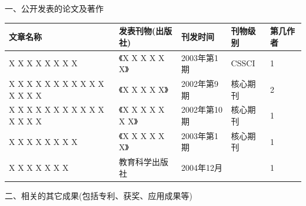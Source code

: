 \achievements

\noindent
一、公开发表的论文及著作
\begin{table}[hbp]
    \linespread{1.1}\selectfont
    \renewcommand\arraystretch{1.2}
    \setlength\tabcolsep{6pt}
    \begin{tabular}{|C{.35\textwidth}|C{.2\textwidth}|C{.14\textwidth}|C{.09\textwidth}|C{.0715\textwidth}|}
        \hline
        \textbf{文章名称} & \textbf{发表刊物(出版社)} & \textbf{刊发时间} & \textbf{刊物级别} & \textbf{第几作者} \\ \hline
        X X X X X X X X & 《X X X X X X》 & 2003年第1期 & CSSCI & 1 \\ \hline
        X X X X X X X X X X X X X X X & 《X X X X X》 & 2002年第9期 & 核心期刊 & 2 \\ \hline
        X X X X X X X X X X X X X X X & 《X X X X X X X》 & 2002年第10期 & 核心期刊 & 1 \\ \hline
        X X X X X X X X & 《X X X X X X》 & 2003年第1期 & 核心期刊 & 1 \\ \hline
        X X X X X X X & 教育科学出版社 & 2004年12月 &  & 1 \\ \hline
    \end{tabular}
\end{table}

\noindent
二、相关的其它成果(包括专利、获奖、应用成果等)